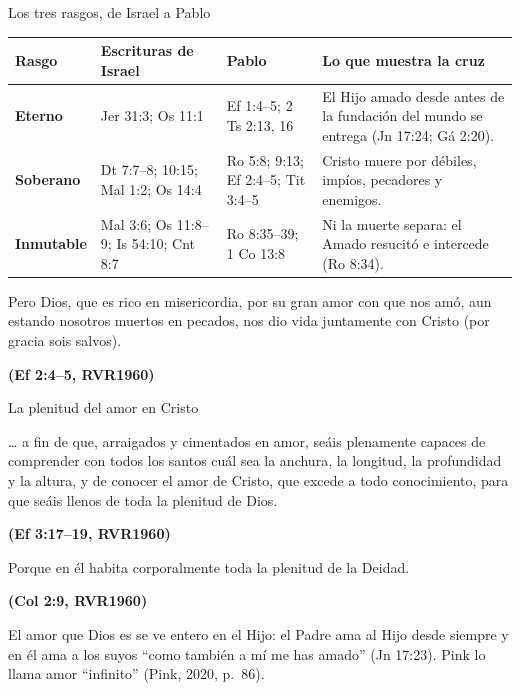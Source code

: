 \documentclass[hyperref={bookmarks=false},aspectratio=169]{beamer}
\newcommand{\fuente}[1]{\par\hfill{\upshape\bfseries\footnotesize\textcolor{azul}{#1}}}
\newcommand{\destacar}[1]{\textbf{\textcolor{azul}{#1}}}
\begin{document}
\begin{frame}{Los tres rasgos, de Israel a Pablo}
\scriptsize\renewcommand{\arraystretch}{1.2}
\begin{tabular}{@{}>{\RaggedRight\arraybackslash}p{1.8cm}>{\RaggedRight\arraybackslash}p{3.1cm}>{\RaggedRight\arraybackslash}p{3.1cm}>{\RaggedRight\arraybackslash}p{3.8cm}@{}}
\toprule
\textbf{Rasgo} & \textbf{Escrituras de Israel} & \textbf{Pablo} & \textbf{Lo que muestra la cruz} \\ \midrule
\destacar{Eterno} & Jer 31:3; Os 11:1 & Ef 1:4--5; 2 Ts 2:13, 16 & El Hijo amado desde antes de la fundación del mundo se entrega (Jn 17:24; Gá 2:20). \\
\destacar{Soberano} & Dt 7:7--8; 10:15; Mal 1:2; Os 14:4 & Ro 5:8; 9:13; Ef 2:4--5; Tit 3:4--5 & Cristo muere por débiles, impíos, pecadores y enemigos. \\
\destacar{Inmutable} & Mal 3:6; Os 11:8--9; Is 54:10; Cnt 8:7 & Ro 8:35--39; 1 Co 13:8 & Ni la muerte separa: el Amado resucitó e intercede (Ro 8:34). \\
\bottomrule
\end{tabular}\par\medskip
\begin{cita}Pero Dios, que es rico en misericordia, por su gran amor con que nos amó, aun estando nosotros muertos en pecados, nos dio vida juntamente con Cristo (por gracia sois salvos).\fuente{(Ef 2:4--5, RVR1960)}\end{cita}
\end{frame}

\begin{frame}{La plenitud del amor en Cristo}
\begin{cita}\ldots{} a fin de que, arraigados y cimentados en amor, seáis plenamente capaces de comprender con todos los santos cuál sea la anchura, la longitud, la profundidad y la altura, y de conocer el amor de Cristo, que excede a todo conocimiento, para que seáis llenos de toda la plenitud de Dios.\fuente{(Ef 3:17--19, RVR1960)}\end{cita}
\begin{cita}Porque en él habita corporalmente toda la plenitud de la Deidad.\fuente{(Col 2:9, RVR1960)}\end{cita}
\small El amor que Dios es se ve entero en el Hijo: el Padre ama al Hijo desde siempre y en él ama a los suyos ``como también a mí me has amado'' (Jn 17:23). Pink lo llama amor ``infinito'' (Pink, 2020, p.~86).
\end{frame}
\end{document}
